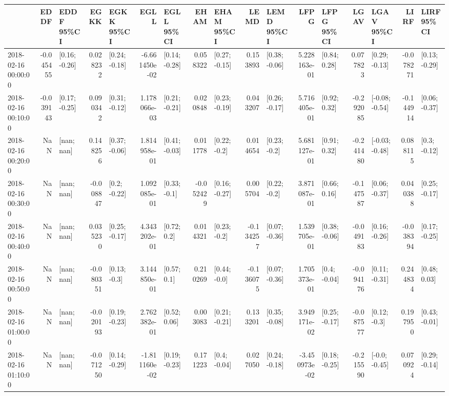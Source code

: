 \begin{tabular}{lrlrlrlrlrlrlrlrl}
\toprule
{} &      EDDF &      EDDF 95\%CI &      EGKK &      EGKK 95\%CI &          EGLL &      EGLL 95\%CI &      EHAM &      EHAM 95\%CI &      LEMD &      LEMD 95\%CI &          LFPG &      LFPG 95\%CI &      LGAV &      LGAV 95\%CI &      LIRF &      LIRF 95\%CI \\
\midrule
2018-02-16 00:00:00 & -0.045455 &   [0.16; -0.26] &  0.028232 &   [0.24; -0.18] & -6.661450e-02 &   [0.14; -0.28] &  0.058322 &   [0.27; -0.15] &  0.153893 &   [0.38; -0.06] &  5.228163e-01 &    [0.84; 0.28] &  0.077823 &   [0.29; -0.13] & -0.078271 &   [0.13; -0.29] \\
2018-02-16 00:10:00 & -0.039143 &   [0.17; -0.25] &  0.090342 &   [0.31; -0.12] &  1.178066e-03 &   [0.21; -0.21] &  0.020848 &   [0.23; -0.19] &  0.043207 &   [0.26; -0.17] &  5.716405e-01 &    [0.92; 0.32] & -0.292085 &  [-0.08; -0.54] & -0.144914 &   [0.06; -0.37] \\
2018-02-16 00:20:00 &       NaN &      [nan; nan] &  0.148256 &   [0.37; -0.06] &  1.814958e-01 &   [0.41; -0.03] &  0.011778 &    [0.22; -0.2] &  0.014654 &    [0.23; -0.2] &  5.681127e-01 &    [0.91; 0.32] & -0.241480 &  [-0.03; -0.48] &  0.088115 &    [0.3; -0.12] \\
2018-02-16 00:30:00 &       NaN &      [nan; nan] & -0.008847 &    [0.2; -0.22] &  1.092085e-01 &    [0.33; -0.1] & -0.052429 &   [0.16; -0.27] &  0.005704 &    [0.22; -0.2] &  3.871087e-01 &    [0.66; 0.16] & -0.147587 &   [0.06; -0.37] &  0.040388 &   [0.25; -0.17] \\
2018-02-16 00:40:00 &       NaN &      [nan; nan] &  0.035230 &   [0.25; -0.17] &  4.343202e-01 &     [0.72; 0.2] &  0.014321 &    [0.23; -0.2] & -0.134257 &   [0.07; -0.36] &  1.539705e-01 &   [0.38; -0.06] & -0.049183 &   [0.16; -0.26] & -0.038394 &   [0.17; -0.25] \\
2018-02-16 00:50:00 &       NaN &      [nan; nan] & -0.080351 &    [0.13; -0.3] &  3.144850e-01 &     [0.57; 0.1] &  0.210269 &    [0.44; -0.0] & -0.136075 &   [0.07; -0.36] &  1.705373e-01 &    [0.4; -0.04] & -0.094176 &   [0.11; -0.31] &  0.244834 &    [0.48; 0.03] \\
2018-02-16 01:00:00 &       NaN &      [nan; nan] & -0.020193 &   [0.19; -0.23] &  2.762382e-01 &    [0.52; 0.06] &  0.003083 &   [0.21; -0.21] &  0.133201 &   [0.35; -0.08] &  3.949171e-02 &   [0.25; -0.17] & -0.087577 &    [0.12; -0.3] &  0.197950 &   [0.43; -0.01] \\
2018-02-16 01:10:00 &       NaN &      [nan; nan] & -0.071250 &   [0.14; -0.29] & -1.811160e-02 &   [0.19; -0.23] &  0.171223 &    [0.4; -0.04] &  0.027050 &   [0.24; -0.18] & -3.450973e-02 &   [0.18; -0.25] & -0.215590 &   [-0.0; -0.45] &  0.070924 &   [0.29; -0.14] \\

\end{tabular}
